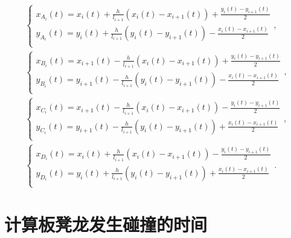 \documentclass[lang=cn,newtx,10pt,scheme=chinese]{../Template/elegantbook}
\begin{document}
\begin{gather}
\begin{cases}
x_{A_i}\left( t \right) =x_i\left( t \right) +\frac{h}{l_{i+1}}\left( x_i\left( t \right) -x_{i+1}\left( t \right) \right) +\frac{y_i\left( t \right) -y_{i+1}\left( t \right)}{2}\\
y_{A_i}\left( t \right) =y_i\left( t \right) +\frac{h}{l_{i+1}}\left( y_i\left( t \right) -y_{i+1}\left( t \right) \right) -\frac{x_i\left( t \right) -x_{i+1}\left( t \right)}{2}\\
\end{cases},
\\
\begin{cases}
x_{B_i}\left( t \right) =x_{i+1}\left( t \right) -\frac{h}{l_{i+1}}\left( x_i\left( t \right) -x_{i+1}\left( t \right) \right) +\frac{y_i\left( t \right) -y_{i+1}\left( t \right)}{2}\\
y_{B_i}\left( t \right) =y_{i+1}\left( t \right) -\frac{h}{l_{i+1}}\left( y_i\left( t \right) -y_{i+1}\left( t \right) \right) -\frac{x_i\left( t \right) -x_{i+1}\left( t \right)}{2}\\
\end{cases},
\\
\begin{cases}
x_{C_i}\left( t \right) =x_{i+1}\left( t \right) -\frac{h}{l_{i+1}}\left( x_i\left( t \right) -x_{i+1}\left( t \right) \right) -\frac{y_i\left( t \right) -y_{i+1}\left( t \right)}{2}\\
y_{C_i}\left( t \right) =y_{i+1}\left( t \right) -\frac{h}{l_{i+1}}\left( y_i\left( t \right) -y_{i+1}\left( t \right) \right) +\frac{x_i\left( t \right) -x_{i+1}\left( t \right)}{2}\\
\end{cases},
\\
\begin{cases}
x_{D_i}\left( t \right) =x_i\left( t \right) +\frac{h}{l_{i+1}}\left( x_i\left( t \right) -x_{i+1}\left( t \right) \right) -\frac{y_i\left( t \right) -y_{i+1}\left( t \right)}{2}\\
y_{D_i}\left( t \right) =y_i\left( t \right) +\frac{h}{l_{i+1}}\left( y_i\left( t \right) -y_{i+1}\left( t \right) \right) +\frac{x_i\left( t \right) -x_{i+1}\left( t \right)}{2}\\
\end{cases}.
\end{gather}

\section{计算板凳龙发生碰撞的时间}
\end{document}
